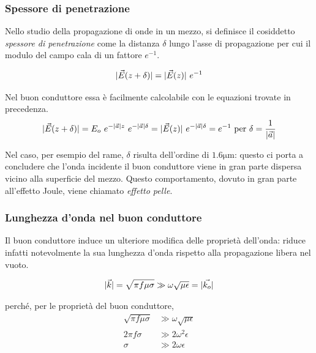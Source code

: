 		\subsubsection{Spessore di penetrazione}
		Nello studio della propagazione di onde in un mezzo, si definisce il cosiddetto \emph{spessore di penetrazione} come la distanza $\delta$ lungo l'asse di propagazione per cui il modulo del campo cala di un fattore $e^{-1}$.

		\begin{equation*}
			|\vec{E}(z + \delta)| = |\vec{E}(z)| ~ e^{-1}
		\end{equation*}

		Nel buon conduttore essa è facilmente calcolabile con le equazioni trovate in precedenza.
		\begin{equation} \begin{split} \label{eq:spessore_penetrazione}
			|\vec{E}(z + \delta)| = E_o ~ e^{-|\vec{a}| z} ~ e^{-|\vec{a}| \delta} = |\vec{E}(z)| ~ e^{-|\vec{a}| \delta} = e^{-1} \text{ per } \delta = \frac{1}{|\vec{a}|}
		\end{split} \end{equation}

		Nel caso, per esempio del rame, $\delta$ risulta dell'ordine di $1.6 \mathrm{\mu m}$: questo ci porta a concludere che l'onda incidente il buon conduttore viene in gran parte dispersa vicino alla superficie del mezzo.
		Questo comportamento, dovuto in gran parte all'effetto Joule, viene chiamato \emph{effetto pelle}.

		\subsubsection{Lunghezza d'onda nel buon conduttore}
		Il buon conduttore induce un ulteriore modifica delle proprietà dell'onda: riduce infatti notevolmente la sua lunghezza d'onda rispetto alla propagazione libera nel vuoto.

		\begin{equation*} \begin{split}
			& |\vec{k}|
				= \sqrt{\pi f \mu \sigma}
				\gg \omega \sqrt{\mu \epsilon}
				= |\vec{k_o}| \\
		\end{split} \end{equation*}

		perché, per le proprietà del buon conduttore,
		\begin{equation*} \begin{split}
				\sqrt{\pi f \mu \sigma} &\gg \omega \sqrt{\mu \epsilon} \\
				2 \pi f \sigma &\gg 2 \omega^2 \epsilon \\
				\sigma &\gg 2 \omega \epsilon
		\end{split} \end{equation*}

